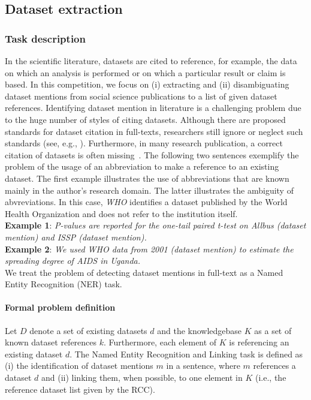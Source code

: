 \subsection{Dataset extraction}
\label{sec:dataset-extraction}
\subsubsection{Task description}
In the scientific literature, datasets are cited to reference, for example, the data on which an analysis is performed or on which a particular result or claim is based.
In this competition, we focus on (i) extracting and (ii) disambiguating dataset mentions from social science publications to a list of given dataset references.
Identifying dataset mention in literature is a challenging problem due to the huge number of styles of citing datasets. Although there are proposed standards for dataset citation in full-texts, researchers still ignore or neglect such standards (see, e.g., \cite{altman2007proposed}).
Furthermore, in many research publication, a correct citation of datasets is often missing~\cite{boland2012identifying}. 
The following two sentences exemplify the problem of the usage of an abbreviation to make a reference to an existing dataset.
The first example illustrates the use of abbreviations that are known mainly in the author's research domain.
The latter illustrates the ambiguity of abvreviations.
In this case, \emph{WHO} identifies a dataset published by the World Health Organization and does not refer to the institution itself.\\
\textbf{Example 1}: \emph{P-values are reported for the one-tail paired t-test on \emph{Allbus} (dataset mention) and \emph{ISSP} (dataset mention).}\\
\textbf{Example 2}: \emph{We used \emph{WHO data from 2001} (dataset mention) to estimate the spreading degree of AIDS in Uganda.}\\
We treat the problem of detecting dataset mentions in full-text as a Named Entity Recognition (NER) task. 
\paragraph{Formal problem definition}%
Let $D$ denote a set of existing datasets $d$ and the knowledgebase $K$ as a set of known dataset references $k$. Furthermore, each element of $K$ is referencing an existing dataset $d$. The Named Entity Recognition and Linking task is defined as (i) the identification of dataset mentions $m$ in a sentence, where $m$ references a dataset $d$ and (ii) linking them, when possible, to one element in $K$ (i.e., the reference dataset list given by the RCC). 


